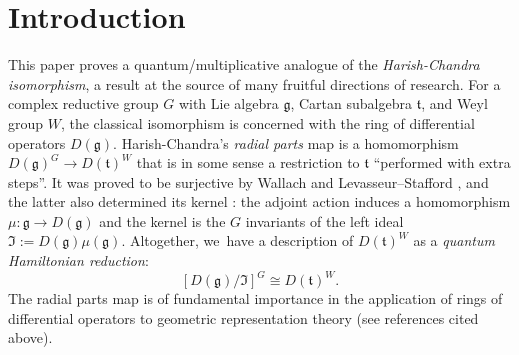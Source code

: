 \section{Introduction}
This paper proves a quantum/multiplicative analogue of the \textit{Harish-Chandra isomorphism}, a result at the source of many fruitful directions of research.
For a complex reductive group $G$ with Lie algebra $\mathfrak{g}$, Cartan subalgebra $\mathfrak{t}$, and Weyl group $W$, the classical isomorphism is concerned with the ring of differential operators $D(\mathfrak{g})$.
Harish-Chandra's \textit{radial parts} map \cite{HCInvDiff} is a homomorphism $D(\mathfrak{g})^G\to D(\mathfrak{t})^W$ that is in some sense a restriction to $\mathfrak{t}$ ``performed with extra steps''.
It was proved to be surjective by Wallach \cite{WallachInv} and Levasseur--Stafford \cite{LevStafJams}, and the latter also determined its kernel \cite{LevStafKer}: the adjoint action induces a homomorphism $\mu:\mathfrak{g}\to D(\mathfrak{g})$ and the kernel is the $G$ invariants of the left ideal $\mathfrak{I}:= D(\mathfrak{g})\mu(\mathfrak{g})$.
Altogether, we~have a description of $D(\mathfrak{t})^W$ as a \textit{quantum Hamiltonian reduction}:
\[
\left[ D(\mathfrak{g})\big/\mathfrak{I} \right]^G\cong D(\mathfrak{t})^W.
\]
The radial parts map is of fundamental importance in the application of rings of differential operators to geometric representation theory (see references cited above).

